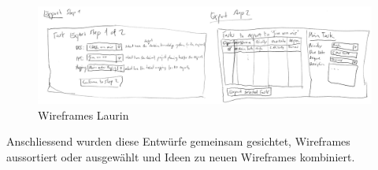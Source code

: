 		\begin{figure}[H]
			\begin{minipage}[b]{\linewidth}		
				\includegraphics[width=\linewidth]{interfacesAndProtocols/media/img/wireframesLaurin3.jpg}
			\end{minipage}			
			\centering
			\caption{Wireframes Laurin}
			\label{fig:wireframesLaurin}
		\end{figure}
		
		Anschliessend wurden diese Entwürfe gemeinsam gesichtet, 
		Wireframes aussortiert oder ausgewählt und Ideen zu neuen Wireframes kombiniert.
		
